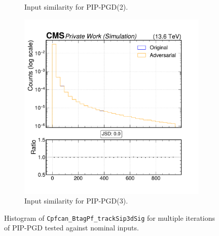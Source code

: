 \begin{figure}[htbp]
\begin{subfigure}[t]{0.32\textwidth}
    \caption*{Input similarity for PIP-PGD(2).}
  \end{subfigure}\hfill
  \begin{subfigure}[t]{0.32\textwidth}
    \includegraphics[width=\linewidth]{media/output/features/compare/combined_it_3/cmp_cpf_arr_Cpfcan_BtagPf_trackSip3dSig.pdf}
    \caption*{Input similarity for PIP-PGD(3).}
  \end{subfigure}

  \caption*{Histogram of \texttt{Cpfcan\_BtagPf\_trackSip3dSig} for multiple iterations of PIP-PGD tested against nominal inputs.}
  \label{fig:combined_input_Cpfcan_BtagPf_trackSip3dSig}
\end{figure}

